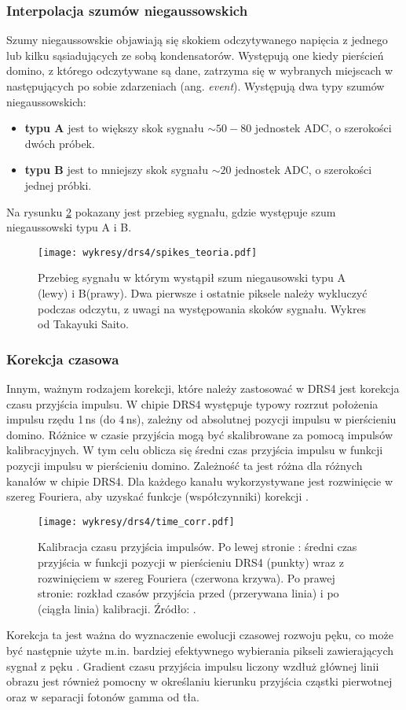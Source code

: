 \documentclass[a4paper,11pt,twoside]{article}
\begin{document}
\subsubsection{Interpolacja szumów niegaussowskich}
Szumy niegaussowskie objawiają się skokiem odczytywanego napięcia z jednego lub kilku sąsiadujących ze sobą kondensatorów. Występują one kiedy pierścień domino, z którego odczytywane są dane, zatrzyma się w wybranych miejscach w następujących po sobie zdarzeniach (ang. \textsl{event}). Występują dwa typy szumów niegaussowskich:
\begin{itemize}
\item {\bf{typu A}} jest to większy skok sygnału $\sim 50 - 80$ jednostek ADC, o szerokości dwóch próbek.
\item {\bf{typu B}} jest to mniejszy skok sygnału $\sim 20$ jednostek ADC, o szerokości jednej próbki.
\end{itemize}
Na rysunku \ref{fig:spike_corr} pokazany jest przebieg sygnału, gdzie występuje szum niegaussowski typu A i B. 
\begin{figure}[H] 
\centering
\texttt{[image: wykresy/drs4/spikes\_teoria.pdf]}
\caption{Przebieg sygnału w którym wystąpił szum niegausowski typu A (lewy) i B(prawy). Dwa pierwsze i ostatnie piksele należy wykluczyć podczas odczytu, z uwagi na występowania skoków sygnału. Wykres od Takayuki Saito.}
\label{fig:spike_corr}
\end{figure}
\subsubsection{Korekcja czasowa}
Innym, ważnym rodzajem korekcji, które należy zastosować w DRS4 jest korekcja czasu przyjścia impulsu. W chipie DRS4 występuje typowy rozrzut położenia impulsu rzędu 1\,ns (do 4\,ns), zależny od absolutnej pozycji impulsu w pierścieniu domino. Różnice w czasie przyjścia mogą być skalibrowane za pomocą impulsów kalibracyjnych. W tym celu oblicza się średni czas przyjścia impulsu w funkcji pozycji impulsu w pierścieniu domino. Zależność ta jest różna dla różnych kanałów w chipie DRS4. Dla każdego kanału wykorzystywane jest rozwinięcie w szereg Fouriera, aby uzyskać funkcje (współczynniki) korekcji \cite{drs4_magic}. 
\begin{figure}[H] 
\centering
\texttt{[image: wykresy/drs4/time\_corr.pdf]}
\caption{Kalibracja czasu przyjścia impulsów. Po lewej stronie : średni czas przyjścia w funkcji pozycji w pierścieniu DRS4 (punkty) wraz z rozwinięciem w szereg Fouriera (czerwona krzywa). Po prawej stronie: rozkład czasów przyjścia przed (przerywana linia) i po (ciągła linia) kalibracji. Źródło: \cite{drs4_magic}. }
\label{fig:spike_corr}
\end{figure}
Korekcja ta jest ważna do wyznaczenie ewolucji czasowej rozwoju pęku, co może być następnie użyte m.in. bardziej efektywnego wybierania pikseli zawierających sygnał z pęku \cite{time_corr}. Gradient czasu przyjścia impulsu liczony wzdłuż głównej linii obrazu jest również pomocny w określaniu kierunku przyjścia cząstki pierwotnej oraz w separacji fotonów gamma od tła.
\end{document}
